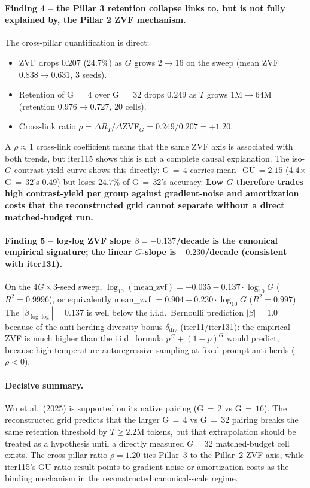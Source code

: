 \paragraph{Finding 4 -- the Pillar 3 retention collapse links to, but is not
fully explained by, the Pillar 2 ZVF mechanism.}
The cross-pillar quantification is direct:
\begin{itemize}\itemsep2pt
\item ZVF drops $0.207$ (24.7\%) as $G$ grows $2\!\to\!16$ on the sweep
      (mean ZVF $0.838\!\to\!0.631$, 3 seeds).
\item Retention of G$\,{=}\,4$ over G$\,{=}\,32$ drops $0.249$ as $T$
      grows $1$M$\!\to\!64$M (retention $0.976\!\to\!0.727$, 20 cells).
\item Cross-link ratio $\rho = \Delta R_{T} / \Delta$ZVF$_{G} = 0.249 / 0.207
      = +1.20$.
\end{itemize}
A $\rho\!\approx\!1$ cross-link coefficient means that the same ZVF axis is
associated with both trends, but iter115 shows this is not a complete causal
explanation. The iso-$G$ contrast-yield curve
shows this directly: G$\,{=}\,4$ carries mean\_GU$\,=2.15$ (4.4$\times$ G$\,{=}\,32$'s
$0.49$) but loses $24.7$\% of G$\,{=}\,32$'s accuracy. \textbf{Low $G$
therefore trades high contrast-yield per group against gradient-noise and
amortization costs that the reconstructed grid cannot separate without a
direct matched-budget run.}

\paragraph{Finding 5 -- log-log ZVF slope $\beta = -0.137$/decade is
the canonical empirical signature; the linear $G$-slope is
$-0.230$/decade (consistent with iter131).}
On the $4G\!\times\!3$-seed sweep, $\log_{10}(\text{mean\_zvf}) =
-0.035 - 0.137 \cdot \log_{10}G$ ($R^{2}\!=\!0.9996$), or equivalently
mean\_zvf $= 0.904 - 0.230 \cdot \log_{10}G$ ($R^{2}\!=\!0.997$). The
$|\beta_{\log\log}| = 0.137$ is well below the i.i.d.\ Bernoulli
prediction $|\beta|\!=\!1.0$ because of the anti-herding diversity bonus
$\delta_{\text{div}}$ (iter11/iter131): the empirical ZVF is much
higher than the i.i.d.\ formula
$p^{G} + (1-p)^{G}$ would predict, because high-temperature
autoregressive sampling at fixed prompt anti-herds ($\rho\!<\!0$).

\paragraph{Decisive summary.}
Wu et al.\ (2025) is supported on its native pairing (G$\,{=}\,2$
vs G$\,{=}\,16$). The reconstructed grid predicts that the larger
G$\,{=}\,4$ vs G$\,{=}\,32$ pairing breaks the same retention threshold by
$T\!\ge\!2.2$M tokens, but that extrapolation should be treated as a
hypothesis until a directly measured $G{=}32$ matched-budget cell exists. The
cross-pillar ratio $\rho\!=\!1.20$ ties Pillar~3 to the Pillar~2 ZVF axis,
while iter115's GU-ratio result points to gradient-noise or amortization costs
as the binding mechanism in the reconstructed canonical-scale regime.
